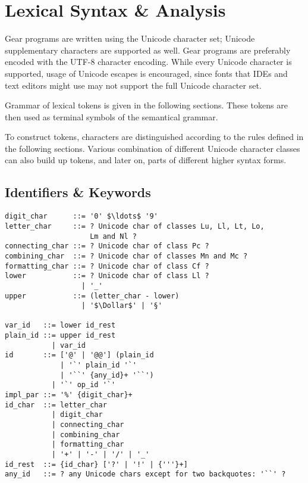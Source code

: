 
\newcommand{\Unicode}[1]{\mbox{$\backslash$u{#1}}}
\newcommand{\UnicodeRange}[2]{\mbox{$\backslash$u{#1}-$\backslash$u{#2}}}

\chapter{Lexical Syntax \& Analysis}
\label{sec:lexical-analysis}

\minitoc

Gear programs are written using the Unicode character set; Unicode supplementary characters are supported as well. Gear programs are preferably encoded with the UTF-8 character encoding. While every Unicode character is supported, usage of Unicode escapes is encouraged, since fonts that IDEs and text editors might use may not support the full Unicode character set.

Grammar of lexical tokens is given in the following sections. These tokens are then used as terminal symbols of the semantical grammar. 

To construct tokens, characters are distinguished according to the rules defined in the following sections. Various combination of different Unicode character classes can also build up tokens, and later on, parts of different higher syntax forms. 


\newpage






\section{Identifiers \& Keywords}
\label{sec:identifiers}
\label{sec:keywords}

\syntax\begin{lstlisting}[deletekeywords={of,and,class,for}]
digit_char      ::= '0' $\ldots$ '9'
letter_char     ::= ? Unicode char of classes Lu, Ll, Lt, Lo, 
                    Lm and Nl ?
connecting_char ::= ? Unicode char of class Pc ?
combining_char  ::= ? Unicode char of classes Mn and Mc ?
formatting_char ::= ? Unicode char of class Cf ?
lower           ::= ? Unicode char of class Ll ? 
                  | '_'
upper           ::= (letter_char - lower) 
                  | '$\Dollar$' | '§'

var_id   ::= lower id_rest
plain_id ::= upper id_rest
           | var_id
id       ::= ['@' | '@@'] (plain_id
             | '`' plain_id '`'
             | '``' {any_id}+ '``')
           | '`' op_id '`'
impl_par ::= '%' {digit_char}+
id_char  ::= letter_char
           | digit_char
           | connecting_char
           | combining_char
           | formatting_char
           | '+' | '-' | '/' | '_'
id_rest  ::= {id_char} ['?' | '!' | {'''}+]
any_id   ::= ? any Unicode chars except for two backquotes: '``' ?
\end{lstlisting}

